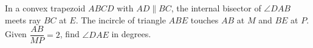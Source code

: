 In a convex trapezoid $ABCD$ with $AD\parallel BC$, the internal bisector of $\angle DAB$ meets ray $BC$ at $E$. The incircle of triangle $ABE$ touches $AB$ at $M$ and $BE$ at $P$. Given $\dfrac{AB}{MP}=2$, find $\angle DAE$ in degrees.
